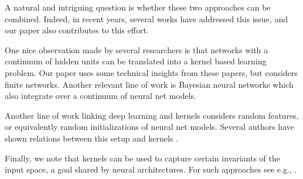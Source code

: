 A natural and intriguing question is whether these two approaches can be combined. Indeed, in recent years, several works have addressed this issue, and our paper \cite{heinemann2016improper} also contributes to this effort.

One nice observation made by several researchers \cite{le2007continuous,cho2009kernel} is that networks with a continuum of hidden units can be translated into a kernel based learning problem. Our paper  \cite{heinemann2016improper} uses some technical insights from these papers, but considers finite networks. Another relevant line of work is Bayesian neural networks \cite{neal1995bayesian} which also integrate over a continuum of neural net models.

Another line of work linking deep learning and kernels considers random features, or equivalently random initializations of neural net models. Several authors have shown relations between this setup and kernels \cite{rahimi2007random,giryes2015deep,daniely2016toward}.

Finally, we note that kernels can be used to capture certain invariants of the input space, a goal shared by neural architectures. For such approaches see e.g., \cite{bruna2013invariant}.


